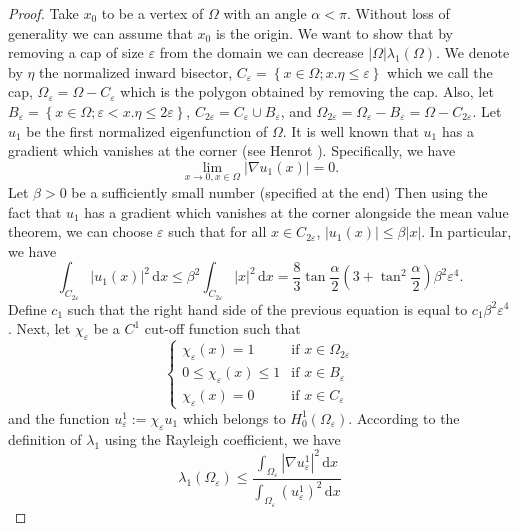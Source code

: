 \begin{proof}
  Take $x_{0}$ to be a vertex of $\Omega$ with an angle $\alpha < \pi$.
  Without loss of generality we can assume that $x_{0}$ is the origin.
  We want to show that by removing a cap of size $\varepsilon$ from the domain we can decrease $| \Omega |\lambda_{1}(\Omega)$.
  We denote by $\eta$ the normalized inward bisector, $C_{\varepsilon} = \left\{ x \in \Omega;x.\eta \leq \varepsilon \right\}$ which we call the cap, $\Omega_{\varepsilon} = \Omega - C_{\varepsilon}$ which is the polygon obtained by removing the cap.
  Also, let $B_{\varepsilon} = \left\{ x \in \Omega; \varepsilon < x.\eta \leq 2 \varepsilon \right\}$, $C_{2 \varepsilon} = C_{\varepsilon} \cup B_{\varepsilon}$, and $\Omega_{2 \varepsilon} =  \Omega_{\varepsilon} - B_{\varepsilon} = \Omega - C_{2 \varepsilon}$.
  Let $u_1$ be the first normalized eigenfunction of $\Omega$.
  It is well known that $u_1$ has a gradient which vanishes at the corner (see Henrot \cite{henrot}).
  Specifically, we have
  \[
  \lim_{x \to 0, x \in \Omega} | \nabla u_1(x) | = 0
  .\] 
  Let $\beta > 0$ be a sufficiently small number (specified at the end)
  Then using the fact that $u_1$ has a gradient which vanishes at the corner alongside the mean value theorem, we can choose $\varepsilon$ such that for all $x \in C_{2 \varepsilon}$, $| u_1(x) | \leq \beta | x |$. 
  In particular, we have
  \[
    \int_{ C_{2 \varepsilon}} \! | u_1(x) |^{2} \, \mathrm{d}x \leq \beta^{2} \int_{ C_{2 \varepsilon}} \! | x |^{2} \, \mathrm{d}x = \frac{8}{3} \tan \frac{\alpha}{2} \left( 3 + \tan^{2} \frac{\alpha}{2} \right ) \beta^{2} \varepsilon^{4}
  .\] 
  Define $c_{1}$ such that the right hand side of the previous equation is equal to $c_{1}\beta^{2}\varepsilon^{4}$.
  Next, let $\chi_{\varepsilon}$ be a $C^{1}$ cut-off function such that 
  \[ 
    \begin{cases}
      \chi_{\varepsilon}(x) = 1 & \text{if } x \in \Omega_{2 \varepsilon} \\
      0 \leq \chi_{\varepsilon}(x) \leq  1 & \text{if } x \in B_{\varepsilon} \\
      \chi_{\varepsilon}(x) = 0 & \text{if } x \in C_{\varepsilon}
    \end{cases}
  \] 
  and the function $u_{\varepsilon}^{1} := \chi_{\varepsilon} u_1$ which belongs to $H_{0}^{1}(\Omega_{\varepsilon})$.
  According to the definition of $\lambda_{1}$ using the Rayleigh coefficient, we have
  \[
  \lambda_{1}(\Omega_{\varepsilon}) \leq \frac{\int_{ \Omega_{\varepsilon}} \! | \nabla u_{\varepsilon}^{1} |^{2} \, \mathrm{d}x }{\int_{ \Omega_{\varepsilon}} \! (u_{\varepsilon}^{1})^{2} \, \mathrm{d}x }
\]
\end{proof}
